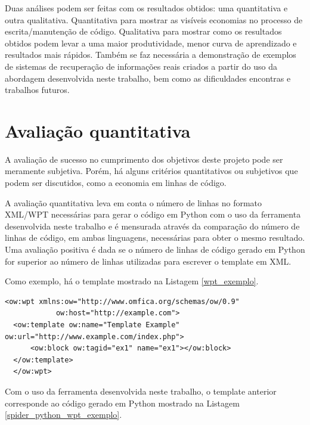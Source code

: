 Duas análises podem ser feitas com os resultados obtidos: uma quantitativa e outra qualitativa. Quantitativa para mostrar as visíveis economias no processo de escrita/manutenção de código. Qualitativa para mostrar como os resultados obtidos podem levar a uma maior produtividade, menor curva de aprendizado e resultados mais rápidos. Também se faz necessária a demonstração de exemplos de sistemas de recuperação de informações reais criados a partir do uso da abordagem desenvolvida neste trabalho, bem como as dificuldades encontras e trabalhos futuros.

\section{Avaliação quantitativa}

A avaliação de sucesso no cumprimento dos objetivos deste projeto pode ser meramente subjetiva. Porém, há alguns critérios quantitativos ou subjetivos que podem ser discutidos, como a economia em linhas de código. 

A avaliação quantitativa leva em conta o número de linhas no formato XML/WPT necessárias para gerar o código em Python com o uso da ferramenta desenvolvida neste trabalho e é mensurada através da comparação do número de linhas de código, em ambas linguagens, necessárias para obter o mesmo resultado. Uma avaliação positiva é dada se o número de linhas de código gerado em Python for superior ao número de linhas utilizadas para escrever o template em XML.

Como exemplo, há o template mostrado na Listagem \ref{wpt_exemplo}.

\begin{lstlisting}[label=wpt_exemplo]
  <ow:wpt xmlns:ow="http://www.omfica.org/schemas/ow/0.9"
            ow:host="http://example.com">
  <ow:template ow:name="Template Example" ow:url="http://www.example.com/index.php">
      <ow:block ow:tagid="ex1" name="ex1"></ow:block>
  </ow:template> 
  </ow:wpt>
\end{lstlisting}

Com o uso da ferramenta desenvolvida neste trabalho, o template anterior corresponde ao código gerado em Python mostrado na Listagem \ref{spider_python_wpt_exemplo}.

